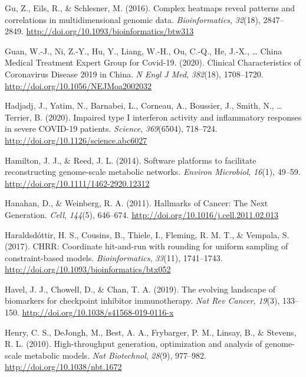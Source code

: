 \documentclass[12pt,twoside,openany,\mydriver]{thesis}  %
\begin{document}
\leavevmode\hypertarget{ref-gu_complex_2016}{}%
Gu, Z., Eils, R., \& Schlesner, M. (2016). Complex heatmaps reveal patterns and correlations in multidimensional genomic data. \emph{Bioinformatics}, \emph{32}(18), 2847--2849. \url{http://doi.org/10.1093/bioinformatics/btw313}

\leavevmode\hypertarget{ref-guan_clinical_2020}{}%
Guan, W.-J., Ni, Z.-Y., Hu, Y., Liang, W.-H., Ou, C.-Q., He, J.-X., \ldots{} China Medical Treatment Expert Group for Covid-19. (2020). Clinical Characteristics of Coronavirus Disease 2019 in China. \emph{N Engl J Med}, \emph{382}(18), 1708--1720. \url{http://doi.org/10.1056/NEJMoa2002032}

\leavevmode\hypertarget{ref-hadjadj_impaired_2020}{}%
Hadjadj, J., Yatim, N., Barnabei, L., Corneau, A., Boussier, J., Smith, N., \ldots{} Terrier, B. (2020). Impaired type I interferon activity and inflammatory responses in severe COVID-19 patients. \emph{Science}, \emph{369}(6504), 718--724. \url{http://doi.org/10.1126/science.abc6027}

\leavevmode\hypertarget{ref-hamilton_software_2014}{}%
Hamilton, J. J., \& Reed, J. L. (2014). Software platforms to facilitate reconstructing genome-scale metabolic networks. \emph{Environ Microbiol}, \emph{16}(1), 49--59. \url{http://doi.org/10.1111/1462-2920.12312}

\leavevmode\hypertarget{ref-hanahan_hallmarks_2011}{}%
Hanahan, D., \& Weinberg, R. A. (2011). Hallmarks of Cancer: The Next Generation. \emph{Cell}, \emph{144}(5), 646--674. \url{http://doi.org/10.1016/j.cell.2011.02.013}

\leavevmode\hypertarget{ref-haraldsdottir_chrr_2017}{}%
Haraldsdóttir, H. S., Cousins, B., Thiele, I., Fleming, R. M. T., \& Vempala, S. (2017). CHRR: Coordinate hit-and-run with rounding for uniform sampling of constraint-based models. \emph{Bioinformatics}, \emph{33}(11), 1741--1743. \url{http://doi.org/10.1093/bioinformatics/btx052}

\leavevmode\hypertarget{ref-havel_evolving_2019}{}%
Havel, J. J., Chowell, D., \& Chan, T. A. (2019). The evolving landscape of biomarkers for checkpoint inhibitor immunotherapy. \emph{Nat Rev Cancer}, \emph{19}(3), 133--150. \url{http://doi.org/10.1038/s41568-019-0116-x}

\leavevmode\hypertarget{ref-henry_high-throughput_2010}{}%
Henry, C. S., DeJongh, M., Best, A. A., Frybarger, P. M., Linsay, B., \& Stevens, R. L. (2010). High-throughput generation, optimization and analysis of genome-scale metabolic models. \emph{Nat Biotechnol}, \emph{28}(9), 977--982. \url{http://doi.org/10.1038/nbt.1672}
\end{document}
